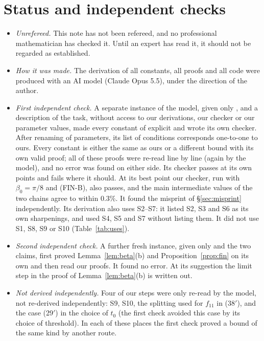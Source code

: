 \documentclass[11pt]{amsart}
\theoremstyle{remark}
\theoremstyle{plain}
\begin{document}
\section{Status and independent checks}\label{sec:status}

\begin{itemize}[leftmargin=*]
\item \emph{Unrefereed.} This note has not been refereed, and no professional mathematician has checked it. Until an expert has read it, it should not be regarded as established.
\item \emph{How it was made.} The derivation of all constants, all proofs and all code were produced with an AI model (Claude Opus 5.5), under the direction of the author.
\item \emph{First independent check.} A separate instance of the model, given only \cite{Bir00b}, \cite{Bir94} and a description of the task, without access to our derivations, our checker or our parameter values, made every constant of \cite{Bir00b} explicit and wrote its own checker. After renaming of parameters, its list of conditions corresponds one-to-one to ours. Every constant is either the same as ours or a different bound with its own valid proof; all of these proofs were re-read line by line (again by the model), and no error was found on either side. Its checker passes at its own points and fails where it should. At its best point our checker, run with $\beta_0=\pi/8$ and (FIN-B), also passes, and the main intermediate values of the two chains agree to within $0.3\%$. It found the misprint of \S\ref{sec:misprint} independently. Its derivation also uses S2--S7: it listed S2, S3 and S6 as its own sharpenings, and used S4, S5 and S7 without listing them. It did not use S1, S8, S9 or S10 (Table~\ref{tab:uses}).
\item \emph{Second independent check.} A further fresh instance, given only \cite{Bir00b} and the two claims, first proved Lemma~\ref{lem:beta}(b) and Proposition~\ref{prop:fin} on its own and then read our proofs. It found no error. At its suggestion the limit step in the proof of Lemma~\ref{lem:beta}(b) is written out.
\item \emph{Not derived independently.} Four of our steps were only re-read by the model, not re-derived independently: S9, S10, the splitting used for $f_{11}$ in (38$'$), and the case (29$'$) in the choice of $t_0$ (the first check avoided this case by its choice of threshold). In each of these places the first check proved a bound of the same kind by another route.

\end{itemize}
\end{document}
